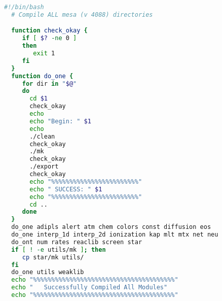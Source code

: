 \begin{lstlisting}[language=bash,mathescape=false]
  #!/bin/bash
  # Compile ALL mesa (v 4088) directories

  function check_okay {
     if [ $? -ne 0 ]
     then
        exit 1
     fi
  }
  function do_one {
     for dir in "$@"
     do
       cd $1
       check_okay
       echo
       echo "Begin: " $1
       echo
       ./clean
       check_okay
       ./mk
       check_okay
       ./export
       check_okay
       echo "%%%%%%%%%%%%%%%%%%%%%%%%"
       echo " SUCCESS: " $1
       echo "%%%%%%%%%%%%%%%%%%%%%%%%"
       cd ..
     done
  }
  do_one adipls alert atm chem colors const diffusion eos
  do_one interp_1d interp_2d ionization kap mlt mtx net neu
  do_ont num rates reaclib screen star
  if [ ! -e utils/mk ]; then
     cp star/mk utils/
  fi
  do_one utils weaklib
  echo "%%%%%%%%%%%%%%%%%%%%%%%%%%%%%%%%%%%%%%%"
  echo "   Successfully Compiled All Modules"
  echo "%%%%%%%%%%%%%%%%%%%%%%%%%%%%%%%%%%%%%%%"
\end{lstlisting}

